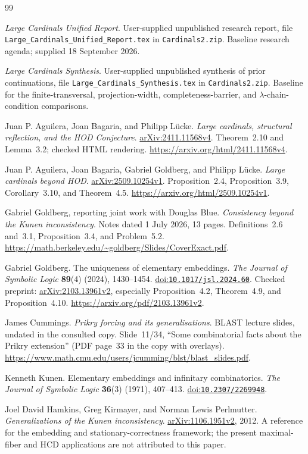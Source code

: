 \documentclass[11pt,letterpaper]{article}
\theoremstyle{definition}
\numberwithin{equation}{section}
\newcommand{\arxiv}[1]{\href{https://arxiv.org/abs/#1}{arXiv:#1}}
\newcommand{\doi}[1]{\href{https://doi.org/#1}{doi:\nolinkurl{#1}}}
\begin{document}
\begin{thebibliography}{99}
\small\raggedright

\emph{Large Cardinals Unified Report}.
User-supplied unpublished research report, file
\texttt{Large\_Cardinals\_Unified\_Report.tex} in \texttt{Cardinals2.zip}.
Baseline research agenda; supplied 18 September 2026.

\emph{Large Cardinals Synthesis}.
User-supplied unpublished synthesis of prior continuations, file
\texttt{Large\_Cardinals\_Synthesis.tex} in \texttt{Cardinals2.zip}.
Baseline for the finite-transversal, projection-width, completeness-barrier,
and $\lambda$-chain-condition comparisons.

Juan P. Aguilera, Joan Bagaria, and Philipp L\"ucke.
\emph{Large cardinals, structural reflection, and the HOD Conjecture}.
\arxiv{2411.11568v4}.
Theorem~2.10 and Lemma~3.2; checked HTML rendering.
\url{https://arxiv.org/html/2411.11568v4}.

Juan P. Aguilera, Joan Bagaria, Gabriel Goldberg, and Philipp L\"ucke.
\emph{Large cardinals beyond HOD}.
\arxiv{2509.10254v1}.
Proposition~2.4, Proposition~3.9, Corollary~3.10, and Theorem~4.5.
\url{https://arxiv.org/html/2509.10254v1}.

Gabriel Goldberg, reporting joint work with Douglas Blue.
\emph{Consistency beyond the Kunen inconsistency}.
Notes dated 1 July 2026, 13 pages.
Definitions~2.6 and~3.1, Proposition~3.4, and Problem~5.2.
\url{https://math.berkeley.edu/~goldberg/Slides/CoverExact.pdf}.

Gabriel Goldberg.
The uniqueness of elementary embeddings.
\emph{The Journal of Symbolic Logic} \textbf{89}(4) (2024), 1430--1454.
\doi{10.1017/jsl.2024.60}.
Checked preprint: \arxiv{2103.13961v2}, especially Proposition~4.2,
Theorem~4.9, and Proposition~4.10.
\url{https://arxiv.org/pdf/2103.13961v2}.

James Cummings.
\emph{Prikry forcing and its generalisations}.
BLAST lecture slides, undated in the consulted copy.
Slide~11/34, ``Some combinatorial facts about the Prikry extension''
(PDF page~33 in the copy with overlays).
\url{https://www.math.cmu.edu/users/jcumming/blst/blast_slides.pdf}.

Kenneth Kunen.
Elementary embeddings and infinitary combinatorics.
\emph{The Journal of Symbolic Logic} \textbf{36}(3) (1971), 407--413.
\doi{10.2307/2269948}.

Joel David Hamkins, Greg Kirmayer, and Norman Lewis Perlmutter.
\emph{Generalizations of the Kunen inconsistency}.
\arxiv{1106.1951v2}, 2012.
A reference for the embedding and stationary-correctness framework;
the present maximal-fiber and HCD applications are not attributed to this paper.

\end{thebibliography}
\end{document}
